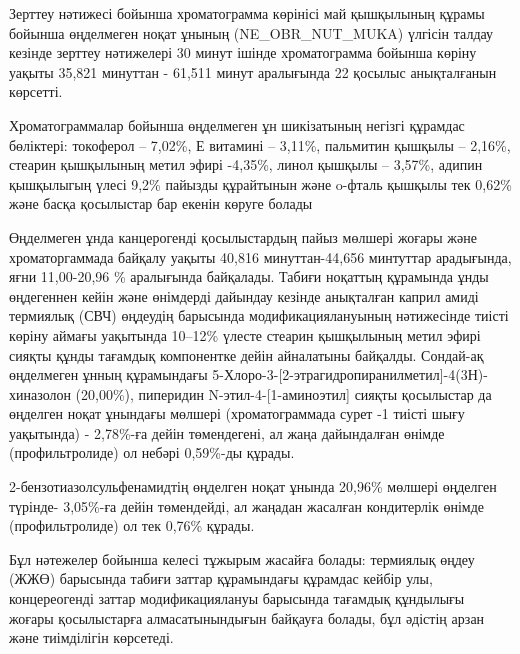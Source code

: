 Зерттеу нәтижесі бойынша хроматограмма көрінісі май қышқылының құрамы
бойынша өңделмеген ноқат ұнының (NE\_OBR\_NUT\_MUKA) үлгісін талдау
кезінде зерттеу нәтижелері 30 минут ішінде хроматограмма бойынша көріну
уақыты 35,821 минуттан - 61,511 минут аралығында 22 қосылыс анықталғанын
көрсетті.

Хроматограммалар бойынша өңделмеген ұн шикізатының негізгі құрамдас
бөліктері: токоферол -- 7,02\%, Е витамині -- 3,11\%, пальмитин қышқылы
-- 2,16\%, стеарин қышқылының метил эфирі -4,35\%, линол қышқылы --
3,57\%, адипин қышқылыгың үлесі 9,2\% пайызды құрайтынын және o-фталь
қышқылы тек 0,62\% және басқа қосылыстар бар екенін көруге болады

Өңделмеген ұнда канцерогенді қосылыстардың пайыз мөлшері жоғары және
хроматоргаммада байқалу уақыты 40,816 минуттан-44,656 минтуттар
арадығында, яғни 11,00-20,96 \% аралығында байқалады. Табиғи ноқаттың
құрамында ұнды өңдегеннен кейін және өнімдерді дайындау кезінде
анықталған каприл амиді термиялық (СВЧ) өңдеудің барысында
модификациялануының нәтижесінде тиісті көріну аймағы уақытында 10--12\%
үлесте стеарин қышқылының метил эфирі сияқты құнды тағамдық компонентке
дейін айналатыны байқалды. Сондай-ақ өңделмеген ұнның құрамындағы
5-Хлоро-3-{[}2-этрагидропиранилметил{]}-4(3Н)-хиназолон (20,00\%),
пиперидин N-этил-4-{[}1-аминоэтил{]} сияқты қосылыстар да өңделген ноқат
ұнындағы мөлшері (хроматограммада сурет -1 тиісті шығу уақытында) -
2,78\%-ға дейін төмендегені, ал жаңа дайындалған өнімде (профильтролиде)
ол небәрі 0,59\%-ды құрады.

2-бензотиазолсульфенамидтің өңделген ноқат ұнында 20,96\% мөлшері
өңделген түрінде- 3,05\%-ға дейін төмендейді, ал жаңадан жасалған
кондитерлік өнімде (профильтролиде) ол тек 0,76\% құрады.

Бұл нәтежелер бойынша келесі тұжырым жасайға болады: термиялық өңдеу
(ЖЖӨ) барысында табиғи заттар құрамындағы құрамдас кейбір улы,
концереогенді заттар модификациялануы барысында тағамдық құндылығы
жоғары қосылыстарға алмасатынындығын байқауға болады, бұл әдістің арзан
және тиімділігін көрсетеді.

